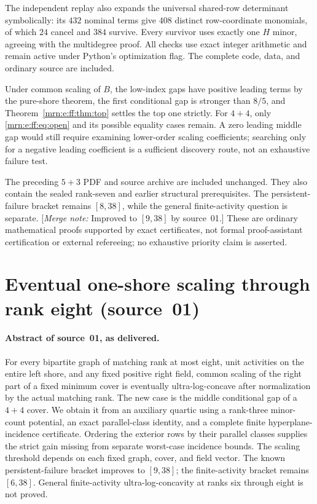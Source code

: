 \documentclass[11pt,a4paper]{article}
\theoremstyle{remark}\newtheorem{remark}[theorem]{Remark}
\newcommand{\mnote}[1]{[\textit{Merge note:} #1]}
\begin{document}
The independent replay also expands the universal shared-row determinant symbolically: its $432$ nominal terms give $408$ distinct row-coordinate monomials, of which $24$ cancel and $384$ survive. Every survivor uses exactly one $H$ minor, agreeing with the multidegree proof. All checks use exact integer arithmetic and remain active under Python's optimization flag. The complete code, data, and ordinary source are included.

Under common scaling of $B$, the low-index gaps have positive leading terms by the pure-shore theorem, the first conditional gap is stronger than $8/5$, and Theorem~\ref{mrn:e:ff:thm:top} settles the top one strictly. For $4+4$, only \eqref{mrn:e:ff:eq:open} and its possible equality cases remain. A zero leading middle gap would still require examining lower-order scaling coefficients; searching only for a negative leading coefficient is a sufficient discovery route, not an exhaustive failure test.

The preceding $5+3$ PDF and source archive are included unchanged. They also contain the sealed rank-seven and earlier structural prerequisites. The persistent-failure bracket remains $[8,38]$, while the general finite-activity question is separate. \mnote{Improved to $[9,38]$ by source~01.} These are ordinary mathematical proofs supported by exact certificates, not formal proof-assistant certification or external refereeing; no exhaustive priority claim is asserted.

\section{Eventual one-shore scaling through rank eight (source~01)}\label{mrn:src:01}
\paragraph{Abstract of source~01, as delivered.} For every bipartite graph of matching rank at most eight, unit activities on the entire left shore, and any fixed positive right field, common scaling of the right part of a fixed minimum cover is eventually ultra-log-concave after normalization by the actual matching rank. The new case is the middle conditional gap of a $4+4$ cover. We obtain it from an auxiliary quartic using a rank-three minor-count potential, an exact parallel-class identity, and a complete finite hyperplane-incidence certificate. Ordering the exterior rows by their parallel classes supplies the strict gain missing from separate worst-case incidence bounds. The scaling threshold depends on each fixed graph, cover, and field vector. The known persistent-failure bracket improves to $[9,38]$; the finite-activity bracket remains $[6,38]$. General finite-activity ultra-log-concavity at ranks six through eight is not proved.
\end{document}

